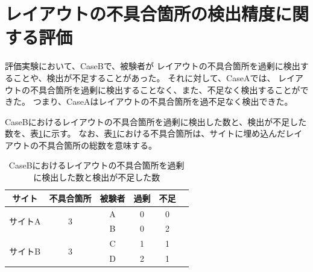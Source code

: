 \section{レイアウトの不具合箇所の検出精度に関する評価}\label{subsec:evalue_accuracy}
評価実験において、CaseBで、被験者が
レイアウトの不具合箇所を過剰に検出することや、検出が不足することがあった。
それに対して、CaseAでは、
レイアウトの不具合箇所を過剰に検出することなく、また、不足なく検出することができた。
つまり、CaseAはレイアウトの不具合箇所を過不足なく検出できた。

CaseBにおけるレイアウトの不具合箇所を過剰に検出した数と、検出が不足した数を、表\ref{tb:result_detect}に示す。
なお、表\ref{tb:result_detect}における不具合箇所は、サイトに埋め込んだレイアウトの不具合箇所の総数を意味する。
\begin{table}[ht]
    \centering
    \caption{CaseBにおけるレイアウトの不具合箇所を過剰に検出した数と検出が不足した数}
    \label{tb:result_detect}
    \begin{tabular}{c||c|c|c|c|c}
        サイト                   & 不具合箇所         & 被験者 & 過剰 & 不足 & \\
        \hline \hline
        \multirow{2}{*}{サイトA} & \multirow{2}{*}{3} & A      & 0    & 0    & \\
        \cline{3-6}
                                 &                    & B      & 0    & 2    & \\
        \hline
        \multirow{2}{*}{サイトB} & \multirow{2}{*}{3} & C      & 1    & 1    & \\
        \cline{3-6}
                                 &                    & D      & 2    & 1    & \\
        \hline \hline
    \end{tabular}
\end{table}

